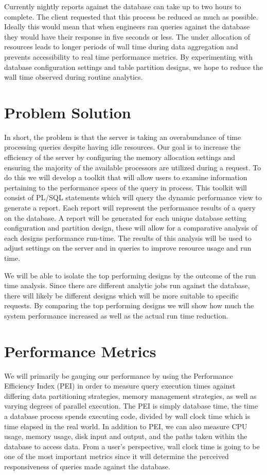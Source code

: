 \documentclass[draftclsnofoot, onecolumn, 10pt]{IEEEtran}
\begin{document}
Currently nightly reports against the database can take up to two hours to complete. The client requested that this process be reduced as much as possible.
Ideally this would mean that when engineers ran queries against the database they would have their response in five seconds or less.
The under allocation of resources leads to longer periods of wall time during data aggregation and prevents accessibility to real time performance metrics.
By experimenting with database configuration settings and table partition designs, we hope to reduce the wall time observed during routine analytics.

\vspace{0.5 in}

\section*{Problem Solution}
In short, the problem is that the server is taking an overabundance of time processing queries despite having idle resources.
Our goal is to increase the efficiency of the server by configuring the memory allocation settings and ensuring the majority of the available processors are utilized during a request.
To do this we will develop a toolkit that will allow users to examine information pertaining to the performance specs of the query in process.
This toolkit will consist of PL/SQL statements which will query the dynamic performance view to generate a report.
Each report will represent the performance results of a query on the database.
A report will be generated for each unique database setting configuration and partition design, these will allow for a comparative analysis of each designs performance run-time.
The results of this analysis will be used to adjust settings on the server and in queries to improve resource usage and run time. 


We will be able to isolate the top performing designs by the outcome of the run time analysis.
Since there are different analytic jobs run against the database, there will likely be different designs which will be more suitable to specific requests.
By comparing the top performing designs we will show how much the system performance increased as well as the actual run time reduction.  

\section*{Performance Metrics}
We will primarily be gauging our performance by using the Performance Efficiency Index (PEI) in order to measure query execution times against differing data partitioning strategies, memory management strategies, as well as varying degrees of parallel execution.
The PEI is simply database time, the time a database process spends executing code, divided by wall clock time which is time elapsed in the real world.
In addition to PEI, we can also measure CPU usage, memory usage, disk input and output, and the paths taken within the database to access data.
From a user’s perspective, wall clock time is going to be one of the most important metrics since it will determine the perceived responsiveness of queries made against the database.
\end{document}
